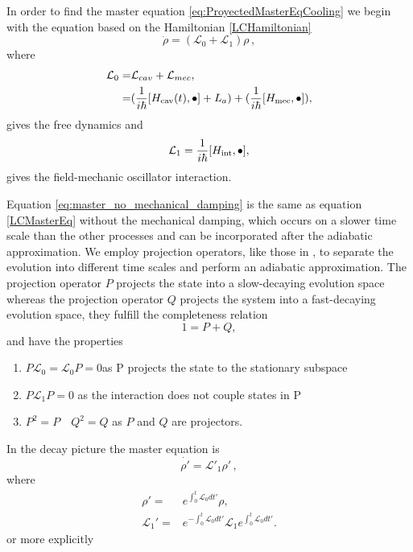\documentclass[reprint, amsmath,amssymb, aps,pra]{revtex4-1}
\begin{document}
In order to find the master equation
\eqref{eq:ProyectedMasterEqCooling} we begin with the equation based on the Hamiltonian \eqref{LCHamiltonian}
\begin{equation}\label{eq:master_no_mechanical_damping}
\dot{\rho}=(\mathcal{L}_0+\mathcal{L}_1)\rho\, ,
\end{equation}
where
\begin{eqnarray}\label{eq:freelindblat}
\mathcal{L}_0=& \mathcal{L}_{cav} + \mathcal{L}_{mec},\\
 =&(\frac{1}{i\hbar}[H_{\rm cav}(t),\bullet]+L_a) +(\frac{1}{i\hbar}[H_{\rm mec},\bullet]), \nonumber
\end{eqnarray}
gives the free dynamics 
and
\begin{equation}
\mathcal{L}_1 = \frac{1}{i\hbar}[H_{\rm int},\bullet],
\end{equation}
gives the field-mechanic oscillator interaction.

Equation \eqref{eq:master_no_mechanical_damping} is the same as
equation \eqref{LCMasterEq} without the mechanical damping, which
occurs on a slower time scale than the other processes and can be
incorporated after the adiabatic approximation. We employ projection
operators, like those in \cite{CarmichaelQO}, to separate the
evolution into different time scales and perform an adiabatic
approximation. The projection operator $P$ projects the state into a
slow-decaying evolution space whereas the projection operator $Q$
projects the system into a fast-decaying evolution space, they fulfill
the completeness relation
\begin{equation}
1 = P + Q,
\end{equation}
and have the properties
\begin{enumerate}

\item $ P\mathcal{L}_{0} = \mathcal{L}_{0}P = 0 $\qquad as P projects the state to the stationary subspace
\item $P\mathcal{L}_{1}P=0$ \qquad as the interaction does not couple states in P

\item $P^2 = P \quad Q^2 = Q$ \qquad as $P$ and $Q$ are projectors.
\end{enumerate}
In the decay picture the master equation is 
\begin{equation}
  \label{eq:master_decay_picture}
    \dot{\rho'} = \mathcal{L}'_1\rho'\, ,
\end{equation}
where
\begin{align*}
 \rho' =& e^{\int_0^t \mathcal{L}_0 dt'}\rho,\\
  \mathcal{L}_1' =& e^{-\int_0^t \mathcal{L}_0 dt'}\mathcal{L}_1e^{\int_0^t \mathcal{L}_0 dt'}.
\end{align*} or more explicitly
\end{document}
